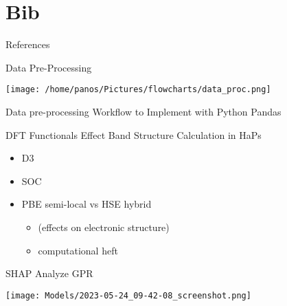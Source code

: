 \documentclass[10pt, aspectratio=169, presentation]{beamer}
\begin{document}
\section{Bib}
\label{sec:org51f55c6}
\begin{frame}[allowframebreaks]{References}
\AtNextBibliography{\tiny}
\printbibliography
\end{frame}
\appendix
\begin{frame}[label={sec:org90885e3}]{Data Pre-Processing}
\begin{center}
\texttt{[image: /home/panos/Pictures/flowcharts/data\_proc.png]}
\end{center}
Data pre-processing Workflow to Implement with Python Pandas
\end{frame}
\begin{frame}[label={sec:orgb48b12c}]{DFT Functionals Effect Band Structure Calculation in HaPs}
\begin{itemize}
\item D3
\item SOC
\item PBE semi-local vs HSE hybrid
\begin{itemize}
\item (effects on electronic structure)
\item computational heft
\end{itemize}
\end{itemize}
\end{frame}
\begin{frame}[label={sec:orgf6ed93b}]{SHAP Analyze GPR}
\begin{center}
\texttt{[image: Models/2023-05-24\_09-42-08\_screenshot.png]}
\end{center}
\end{frame}
\end{document}
